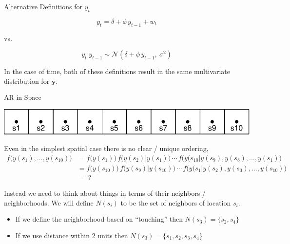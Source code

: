 \documentclass[11pt,ignorenonframetext,]{beamer}
\begin{document}
\begin{frame}{Alternative Definitions for \(y_t\)}
\protect\hypertarget{alternative-definitions-for-y_t}{}

\Large

\[ y_t = \delta + \phi \, y_{t-1} + w_t \]

\vspace{2mm}

\begin{center}vs.\end{center}

\vspace{2mm}

\[ y_t | y_{t-1} \sim \mathcal{N}(\delta + \phi \, y_{t-1},~\sigma^2) \]

\pause

\vspace{3mm}

In the case of time, both of these definitions result in the same
multivariate distribution for \(\symbf{y}\).

\end{frame}

\begin{frame}[t]{AR in Space}
\protect\hypertarget{ar-in-space}{}

\vspace{4mm}

\begin{center}\includegraphics[width=\textwidth]{Lec17_files/figure-beamer/unnamed-chunk-7-1} \end{center}

\pause

Even in the simplest spatial case there is no clear / unique ordering,
\scriptsize \[ \begin{aligned}
f\big(y(s_1), \ldots, y(s_{10})\big) 
  &= f\big(y(s_1)\big) \, f\big(y(s_2) | y(s_1)\big) \, \cdots \, f\big(y(s_{10} | y(s_{9}),y(s_{8}),\ldots,y(s_1)\big)  \\
  &= f\big(y(s_{10})\big) \, f\big(y(s_9) | y(s_{10})\big) \, \cdots \, f\big(y(s_{1} | y(s_{2}),y(s_{3}),\ldots,y(s_{10})\big)  \\
  &= ~?
\end{aligned} \] \normalsize

\pause

Instead we need to think about things in terms of their neighbors /
neighborhoods. We will define \(N(s_i)\) to be the set of neighbors of
location \(s_i\).

\begin{itemize}
\item
  If we define the neighborhood based on “touching” then
  \(N(s_3) = \{s_2, s_4\}\)
\item
  If we use distance within 2 units then
  \(N(s_3) = \{s_1,s_2,s_3,s_4\}\)
\end{itemize}

\end{frame}
\end{document}
